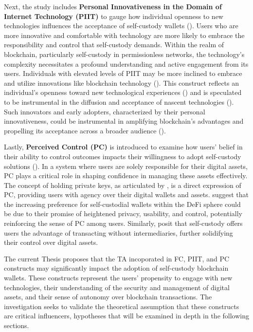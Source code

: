 \documentclass[twocolumn]{article}
\begin{document}
Next, the study includes \textbf{Personal Innovativeness in the Domain of Internet Technology (PIIT)} to gauge how individual openness to new technologies influences the acceptance of self-custody wallets (\cite{agarwal_conceptual_1998}). Users who are more innovative and comfortable with technology are more likely to embrace the responsibility and control that self-custody demands. Within the realm of blockchain, particularly self-custody in permissionless networks, the technology's complexity necessitates a profound understanding and active engagement from its users. Individuals with elevated levels of PIIT may be more inclined to embrace and utilize innovations like blockchain technology (\cite{boateng_understanding_2023, panjaitan_users_2023}). This construct reflects an individual's openness toward new technological experiences (\cite{mani_consumer_2018}) and is speculated to be instrumental in the diffusion and acceptance of nascent technologies (\cite{khazaei_integrating_2020}). Such innovators and early adopters, characterized by their personal innovativeness, could be instrumental in amplifying blockchain's advantages and propelling its acceptance across a broader audience (\cite{salcedo_effects_2021}).

Lastly, \textbf{Perceived Control (PC)} is introduced to examine how users' belief in their ability to control outcomes impacts their willingness to adopt self-custody solutions (\cite{skinner_guide_1996}). In a system where users are solely responsible for their digital assets, PC plays a critical role in shaping confidence in managing these assets effectively. The concept of holding private keys, as articulated by \textcite{kaal_custody_2021}, is a direct expression of PC, providing users with agency over their digital wallets and assets. \textcite{vadlamani_bridging_2023} suggest that the increasing preference for self-custodial wallets within the DeFi sphere could be due to their promise of heightened privacy, usability, and control, potentially reinforcing the sense of PC among users. Similarly, \textcite{jaroucheh_crypto_2023} posit that self-custody offers users the advantage of transacting without intermediaries, further solidifying their control over digital assets.

The current Thesis proposes that the TA incoporated in FC, PIIT, and PC constructs may significantly impact the adoption of self-custody blockchain wallets. These constructs represent the users' propensity to engage with new technologies, their understanding of the security and management of digital assets, and their sense of autonomy over blockchain transactions. The investigation seeks to validate the theoretical assumption that these constructs are critical influencers, hypotheses that will be examined in depth in the following sections.
\end{document}
